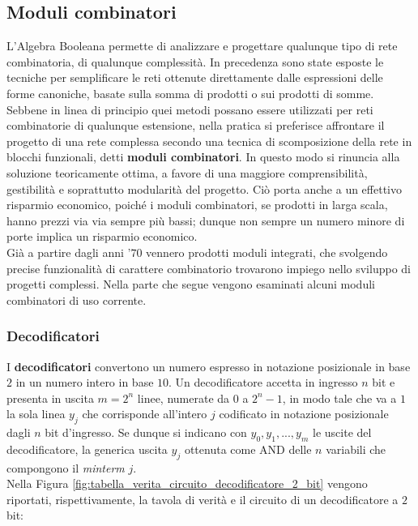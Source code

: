 \documentclass[a4paper]{extarticle}
\begin{document}
\subsection{Moduli combinatori}
L’Algebra Booleana permette di analizzare e progettare qualunque tipo di rete combinatoria, di qualunque complessità. In precedenza sono state esposte le tecniche per semplificare le reti ottenute direttamente dalle espressioni delle forme canoniche, basate sulla somma di prodotti o sui prodotti di somme.\\
Sebbene in linea di principio quei metodi possano essere utilizzati per reti combinatorie di qualunque estensione, nella pratica si preferisce affrontare il progetto di una rete complessa secondo una tecnica di scomposizione della rete in blocchi funzionali, detti \textbf{moduli combinatori}. In questo modo si rinuncia alla soluzione teoricamente ottima, a favore di una maggiore comprensibilità, gestibilità e soprattutto modularità del progetto. Ciò porta anche a un effettivo risparmio economico, poiché i moduli combinatori, se prodotti in larga scala, hanno prezzi via via sempre più bassi; dunque non sempre un numero minore di porte implica un risparmio economico.\\
Già a partire dagli anni '\(70\) vennero prodotti moduli integrati, che svolgendo precise funzionalità di carattere combinatorio trovarono impiego nello sviluppo di progetti complessi. Nella parte che segue vengono esaminati alcuni moduli combinatori di uso corrente.

\vspace{1em}
\subsubsection{Decodificatori}
I \textbf{decodificatori} convertono un numero espresso in notazione posizionale in base \(2\) in un numero intero in base \(10\). Un decodificatore accetta in ingresso \(n\) bit e presenta in uscita \(m = 2^n\) linee, numerate da \(0\) a \(2^n - 1\), in modo tale che va a \(1\) la sola linea \(y_j\) che corrisponde all’intero \(j\) codificato in notazione posizionale dagli \(n\) bit d’ingresso. Se dunque si indicano con \(y_0, y_1, ..., y_m\) le uscite del decodificatore, la generica uscita \(y_j\) ottenuta come AND delle \(n\) variabili che compongono il \textit{minterm} \(j\).\\
Nella Figura \ref{fig:tabella_verita_circuito_decodificatore_2_bit} vengono riportati, rispettivamente, la tavola di verità e il circuito di un decodificatore a \(2\) bit:
\end{document}
